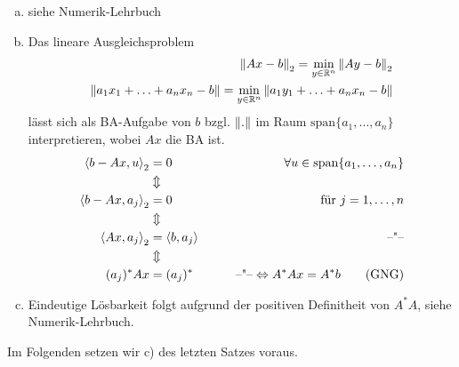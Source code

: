 \begin{enumerate}[a)]
  \item siehe Numerik-Lehrbuch
  \item{Das lineare Ausgleichsproblem \begin{align*}
    \left\lVert Ax-b \right\rVert_2 = \underset{y \in \mathbb{R}^{n}}{\min} \left\lVert Ay - b \right\rVert_2\\
    \left\lVert a_1 x_1 + \ldots + a_n x_n - b \right\rVert = \underset{y \in \mathbb{R}^{n}}{\min} \left\lVert a_1 y_1 + \ldots + a_n x_n - b \right\rVert
    \end{align*} lässt sich als BA-Aufgabe von $b$ bzgl. $\left\lVert . \right\rVert$ im Raum $\mathrm{span}\{a_1, \ldots, a_n\}$ interpretieren,
    wobei $Ax$ die BA ist.
    \begin{align*}
      \left\langle b - Ax, u \right\rangle_2 &= 0 \qquad & \forall u \in \mathrm{span}\{a_1,\ldots, a_n\}\\
      &\Updownarrow\\
      \left\langle b - Ax, a_j \right\rangle_2 &= 0 & \text{für } j=1,\ldots,n\\
      &\Updownarrow\\
      \left\langle Ax, a_j \right\rangle_2 &= \left\langle b, a_j \right\rangle \qquad & \text{--"--}\\
      &\Updownarrow\\
      (a_j)^* Ax &= (a_j)^* \qquad & \text{--"--} \Leftrightarrow A^*Ax = A^* b \tag{GNG}
    \end{align*}}
  \item Eindeutige Lösbarkeit folgt aufgrund der positiven Definitheit von $A^*A$, siehe Numerik-Lehrbuch.
\end{enumerate}
Im Folgenden setzen wir c) des letzten Satzes voraus.

